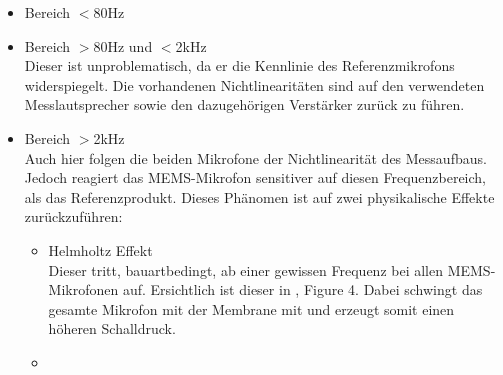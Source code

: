 \documentclass[12pt]{article}
\begin{document}
		\begin{itemize}
			\item \color{green} Bereich $<$80Hz \color{black} \\
			\item Bereich $>$80Hz und $<$2kHz \\
			Dieser ist unproblematisch, da er die Kennlinie des Referenzmikrofons widerspiegelt. Die vorhandenen Nichtlinearitäten sind auf den verwendeten Messlautsprecher sowie den dazugehörigen Verstärker zurück zu führen.
			\item \color{orange} Bereich $>$2kHz \color{black} \\
			Auch hier folgen die beiden Mikrofone der Nichtlinearität des Messaufbaus. Jedoch reagiert das \color{blue}MEMS\color{black}-Mikrofon sensitiver auf diesen Frequenzbereich, als das Referenzprodukt. Dieses Phänomen ist auf zwei physikalische Effekte zurückzuführen:
			\begin{itemize}
				\item Helmholtz Effekt \\
				Dieser tritt, bauartbedingt, ab einer gewissen Frequenz bei allen MEMS-Mikrofonen auf. Ersichtlich ist dieser in \cite{noauthor_httpsinvensensetdkcomwp-contentuploads202007ds-000157-ics-41351-v14pdf_nodate}, Figure 4. Dabei schwingt das gesamte Mikrofon mit der Membrane mit und erzeugt somit einen höheren Schalldruck.
				\item 
			\end{itemize}
			
		\end{itemize}
		
\end{document}
